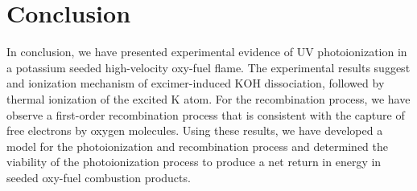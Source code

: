 \section{Conclusion}

In conclusion, we have presented experimental evidence of UV photoionization in a potassium seeded high-velocity oxy-fuel flame. The experimental results suggest and ionization mechanism of excimer-induced KOH dissociation, followed by thermal ionization of the excited K atom. For the recombination process, we have observe a first-order recombination process that is consistent with the capture of free electrons by oxygen molecules. Using these results, we have developed a model for the photoionization and recombination process and determined the viability of the photoionization process to produce a net return in energy in seeded oxy-fuel combustion products. 